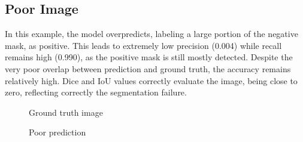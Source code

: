 \documentclass[openany, 12pt]{article}
\begin{document}
\subsection*{Poor Image}
In this example, the model overpredicts, labeling a large portion of the negative mask, as positive. This leads to extremely low precision (0.004) while recall remains high (0.990), as the positive mask is still mostly detected. Despite the very poor overlap between prediction and ground truth, the accuracy remains relatively high. Dice and IoU values correctly evaluate the image, being close to zero, reflecting correctly the segmentation failure. 
\begin{figure}[htbp]
	\centering
	\begin{minipage}{0.47\textwidth}
		\centering
		\caption{Ground truth image}
	\end{minipage}
	\hspace{0.01\textwidth}
	\begin{minipage}{0.47\textwidth}
		\centering
		\caption{Poor prediction}
	\end{minipage}
\end{figure}
\end{document}
